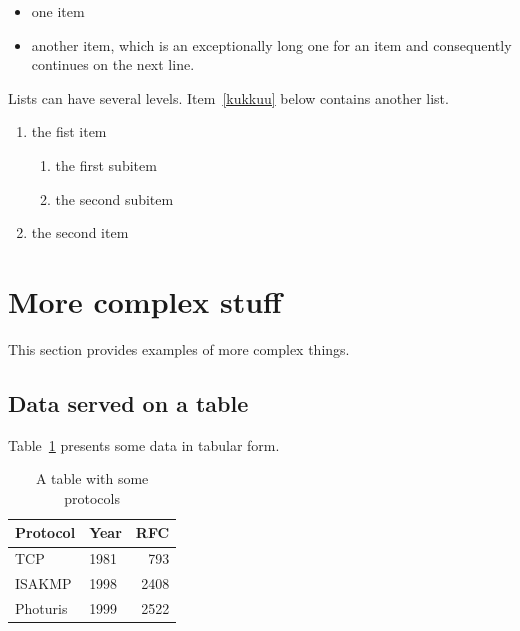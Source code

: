 \documentclass[a4paper,12pt]{article}
\begin{document}
\begin{itemize}
\item one item
\item another item, which is an exceptionally long one for an item
  and consequently continues on the next line.
\end{itemize}

Lists can have several levels. Item~\ref{kukkuu} below contains
another list.
\begin{enumerate}
\item the fist item \label{kukkuu}
  \begin{enumerate}
  \item the first subitem 
  \item the second subitem
  \end{enumerate}
\item the second item
\end{enumerate}




\pagebreak[3]
\section{More complex stuff}

This section provides examples of more complex things.




\subsection{Data served on a table}


Table~\ref{tab:mytable1} presents some data in tabular form. 

\begin{table}[t]
  \begin{center}
    \begin{tabular}{|l|lr|}
    \hline
    Protocol & Year &  RFC \\
    \hline
    TCP      & 1981 &  793 \\
    ISAKMP   & 1998 & 2408 \\
    Photuris & 1999 & 2522 \\
    \hline
    \end{tabular}
    \caption{A table with some protocols}
    \label{tab:mytable1}
  \end{center}
\end{table}
\end{document}

